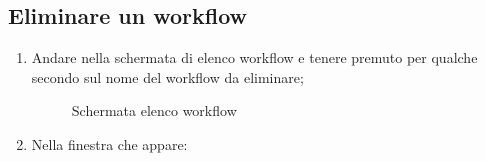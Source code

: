 \subsection{Eliminare un workflow} \label{deleteWorkflow}
\begin{enumerate}
	\item Andare nella schermata di elenco workflow e tenere premuto per qualche secondo sul nome del workflow da eliminare;
	\begin{figure}[!ht]
		\centering
		\caption{Schermata elenco workflow}
	\end{figure}
	\newpage
	\item Nella finestra che appare:

\end{enumerate}
